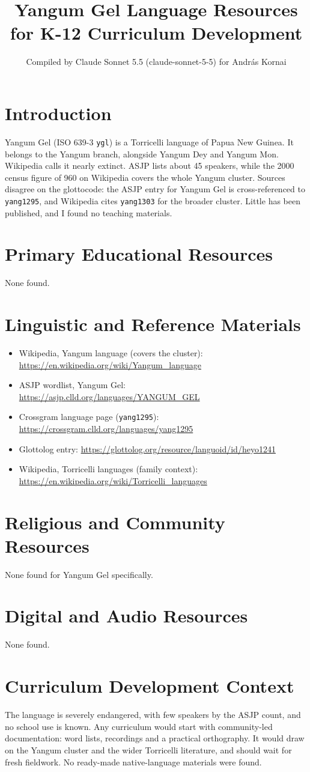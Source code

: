 \documentclass[12pt]{article}
\title{Yangum Gel Language Resources for K-12 Curriculum Development}
\author{Compiled by Claude Sonnet 5.5 (claude-sonnet-5-5) for Andr\'as Kornai}
\date{}
\begin{document}
\maketitle

\section{Introduction}
Yangum Gel (ISO 639-3 \texttt{ygl}) is a Torricelli language of Papua New Guinea. It belongs to the Yangum branch, alongside Yangum Dey and Yangum Mon. Wikipedia calls it nearly extinct. ASJP lists about 45 speakers, while the 2000 census figure of 960 on Wikipedia covers the whole Yangum cluster. Sources disagree on the glottocode: the ASJP entry for Yangum Gel is cross-referenced to \texttt{yang1295}, and Wikipedia cites \texttt{yang1303} for the broader cluster. Little has been published, and I found no teaching materials.

\section{Primary Educational Resources}
None found.

\section{Linguistic and Reference Materials}
\begin{itemize}
\item Wikipedia, Yangum language (covers the cluster): \url{https://en.wikipedia.org/wiki/Yangum_language}
\item ASJP wordlist, Yangum Gel: \url{https://asjp.clld.org/languages/YANGUM_GEL}
\item Crossgram language page (\texttt{yang1295}): \url{https://crossgram.clld.org/languages/yang1295}
\item Glottolog entry: \url{https://glottolog.org/resource/languoid/id/heyo1241}
\item Wikipedia, Torricelli languages (family context): \url{https://en.wikipedia.org/wiki/Torricelli_languages}
\end{itemize}

\section{Religious and Community Resources}
None found for Yangum Gel specifically.

\section{Digital and Audio Resources}
None found.

\section{Curriculum Development Context}
The language is severely endangered, with few speakers by the ASJP count, and no school use is known. Any curriculum would start with community-led documentation: word lists, recordings and a practical orthography. It would draw on the Yangum cluster and the wider Torricelli literature, and should wait for fresh fieldwork. No ready-made native-language materials were found.
\end{document}
